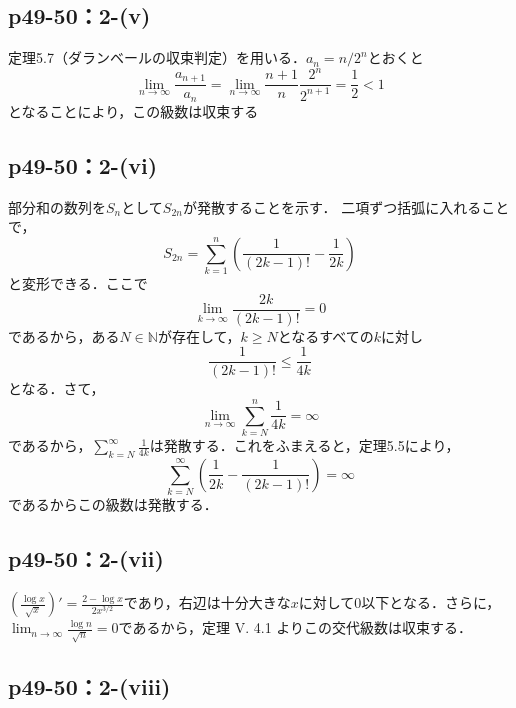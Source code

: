 \documentclass[a4paper,10pt,fleqn]{ltjsarticle}
\begin{document}
  \subsection*{p49-50：2-(v)}


	\begin{screen}
        定理5.7（ダランベールの収束判定）を用いる．$a_n=n/2^n$とおくと
        \[
        \lim_{n \to \infty}\frac{a_{n+1}}{a_n}=\lim_{n \to \infty}\frac{n+1}{n}\frac{2^n}{2^{n+1}}=\frac{1}{2}<1
        \]
        となることにより，この級数は収束する
        \end{screen}
        
    \subsection*{p49-50：2-(vi)}

    \begin{screen}
部分和の数列を$S_{n}$として$S_{2n}$が発散することを示す． 二項ずつ括弧に入れることで，
\[
  S_{2n} = \sum ^{n}_{k=1} \left (\frac{1}{(2k-1)!} - \frac{1}{2k} \right )
\]
と変形できる．ここで
\[
\lim_{k \to \infty} \frac{2k}{(2k-1)!} = 0
\]
であるから，ある$N \in \mathbb{N}$が存在して，$k \geq N$となるすべての$k$に対し
\[
\frac{1}{(2k-1)!} \leq \frac{1}{4k}
\] 
となる．さて，
\[
  \lim_{n \to \infty} \sum ^{n}_{k=N} \frac{1}{4k} = \infty
\]
であるから，$\sum ^{\infty}_{k=N} \frac{1}{4k}$は発散する．これをふまえると，定理5.5により，
\[
  \sum^{\infty}_{k=N} \left (\frac{1}{2k} - \frac{1}{(2k-1)!}\right) =\infty
\]
であるからこの級数は発散する．
    \end{screen}



    \subsection*{p49-50：2-(vii)}
\begin{screen}
  $\left (\frac{\log x}{\sqrt x}\right)' = \frac{2-\log x}{2x^{3/2}}$であり，右辺は十分大きな$x$に対して$0$以下となる．さらに，$\lim _{n \to \infty} \frac{\log n}{\sqrt n} = 0$であるから，定理 V. 4.1 よりこの交代級数は収束する．
\end{screen}

    \subsection*{p49-50：2-(viii)}
\end{document}
